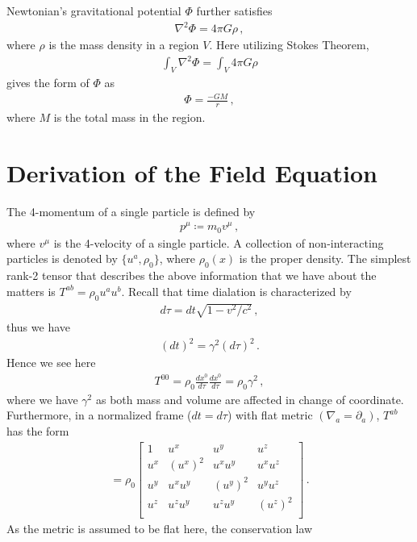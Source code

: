 \documentclass[11pt, onesided]{book}
\theoremstyle{break}
\theoremstyle{break}
\newcommand{\pd}{\partial}
\newcommand{\bmat}[1]{\begin{bmatrix} #1 \end{bmatrix}}
\begin{document}
Newtonian's gravitational potential $\Phi$ further satisfies
\begin{align*}
\nabla^2 \Phi = 4\pi G\rho\,,
\end{align*}
where $\rho $ is the mass density in a region $V$. Here utilizing Stokes Theorem, 
\begin{align*}
\int_V \nabla^2 \Phi = \int_V 4\pi G\rho
\end{align*}
gives the form of $\Phi$ as
\begin{align*}
\Phi = \frac{-GM}{r}\,,
\end{align*}
where $M$ is the total mass in the region. 

\section[Derivation of the Field Equation]{\color{red}Derivation of the Field Equation\color{black}}
The 4-momentum of a single particle is defined by
\begin{align*}
p^\mu \coloneqq m_0 v^\mu\,,
\end{align*}
where $v^\mu$ is the 4-velocity of a single particle. A collection of non-interacting particles is denoted by $\{u^a, \rho_0\}$, where $\rho_0(x)$ is the proper density. The simplest rank-2 tensor that describes the above information that we have about the matters is $T^{ab}= \rho_0 u^a u^b$. Recall that time dialation is characterized by
\begin{align*}
d\tau = dt \sqrt{1-v^2/c^2}\,,
\end{align*}
thus we have
\begin{align*}
(dt)^2 = \gamma^2 ( d\tau)^2\,.
\end{align*}
Hence we see here
\begin{align*}
T^{00} = \rho_0 \frac{dx^0}{d\tau}\frac{dx^0}{d\tau} = \rho_0 \gamma^2\,,
\end{align*}
where we have $\gamma^2$ as both mass and volume are affected in change of coordinate. Furthermore, in a normalized frame ($dt = d\tau$) with flat metric $(\nabla_a = \pd_a)$, $T^{ab}$ has the form
\begin{align*}
[T^{ab}] = \rho_0\bmat{ 
1 & u^x & u^y & u^z \\
u^x & (u^x)^2 & u^xu^y & u^xu^z\\
u^y & u^xu^y & (u^y)^2 & u^yu^z\\
u^z & u^zu^y & u^zu^y & (u^z)^2\\
}\,.
\end{align*}
As the metric is assumed to be flat here, the conservation law
\end{document}
